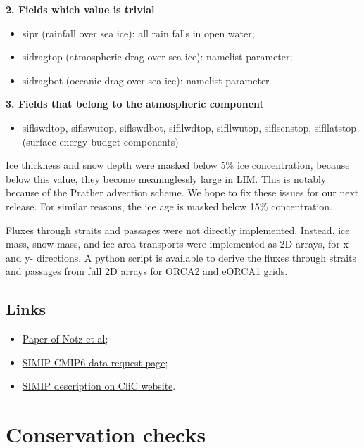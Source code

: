 \documentclass[../main/SI3_manual]{subfiles}
\begin{document}
\textbf{2. Fields which value is trivial}
\begin{itemize}
\item sipr (rainfall over sea ice): all rain falls in open water;
\item sidragtop (atmospheric drag over sea ice): namelist parameter;
\item sidragbot (oceanic drag over sea ice): namelist parameter
\end{itemize}

\textbf{3. Fields that belong to the atmospheric component}
\begin{itemize}
\item siflswdtop, siflswutop, siflswdbot, sifllwdtop, sifllwutop, siflsenstop, sifllatstop (surface energy budget components)
\end{itemize}

Ice thickness and snow depth were masked below 5\% ice concentration, because below this value, they become meaninglessly large in LIM. This is notably because of the Prather advection scheme. We hope to fix these issues for our next release. For similar reasons, the ice age is masked below 15\% concentration.

Fluxes through straits and passages were not directly implemented. Instead, ice mass, snow mass, and ice area transports were implemented as 2D arrays, for x- and y- directions. A python script is available to derive the fluxes through straits and passages from full 2D arrays for ORCA2 and eORCA1 grids.

\subsection{Links}

\begin{itemize}
\item \textcolor{blue}{\href{http://www.geosci-model-dev.net/9/3427/2016/}{Paper of Notz et al}};
\item \textcolor{blue}{\href{http://clipc-services.ceda.ac.uk/dreq/u/SIMIP.html}{SIMIP CMIP6 data request page}};
\item \textcolor{blue}{\href{http://www.climate-cryosphere.org/activities/targeted/simip}{SIMIP description on CliC website}}.
\end{itemize}

\section{Conservation checks}
\end{document}
